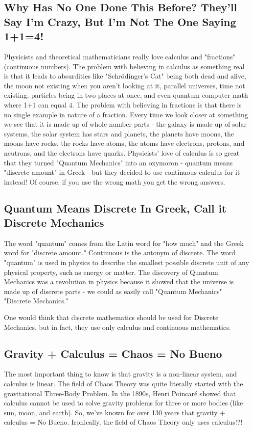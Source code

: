 \documentclass{report}
\begin{document}
\subsection*{Why Has No One Done This Before? They'll Say I'm Crazy, But I'm Not The One Saying 1+1=4!}
Physicists and theoretical mathematicians really love calculus and "fractions" (continuous numbers). The problem with believing in calculus as something real is that it leads to absurdities like "Schrödinger's Cat" being both dead and alive, the moon not existing when you aren't looking at it, parallel universes, time not existing, particles being in two places at once, and even quantum computer math where 1+1 can equal 4. The problem with believing in fractions is that there is no single example in nature of a fraction\cite{Gisin2018}. Every time we look closer at something we see that it is made up of whole number parts - the galaxy is made up of solar systems, the solar system has stars and planets, the planets have moons, the moons have rocks, the rocks have atoms, the atoms have electrons, protons, and neutrons, and the electrons have quarks. Physicists’ love of calculus is so great that they turned "Quantum Mechanics" into an oxymoron - quantum means "discrete amount" in Greek - but they decided to use continuous calculus for it instead! Of course, if you use the wrong math you get the wrong answers.

\subsection*{Quantum Means Discrete In Greek, Call it Discrete Mechanics}
The word "quantum" comes from the Latin word for "how much" and the Greek word for "discrete amount." Continuous is the antonym of discrete. The word "quantum" is used in physics to describe the smallest possible discrete unit of any physical property, such as energy or matter. The discovery of Quantum Mechanics was a revolution in physics because it showed that the universe is made up of discrete parts - we could as easily call "Quantum Mechanics" "Discrete Mechanics."

One would think that discrete mathematics should be used for Discrete Mechanics, but in fact, they use only calculus and continuous mathematics. 

\subsection*{Gravity + Calculus = Chaos = No Bueno}
The most important thing to know is that gravity is a non-linear system, and calculus is linear. The field of Chaos Theory was quite literally started with the gravitational Three-Body Problem. In the 1890s, Henri Poincaré showed that calculus cannot be used to solve gravity problems for three or more bodies (like sun, moon, and earth). So, we've known for over 130 years that gravity + calculus = No Bueno. Ironically, the field of Chaos Theory only uses calculus!?!
\end{document}
